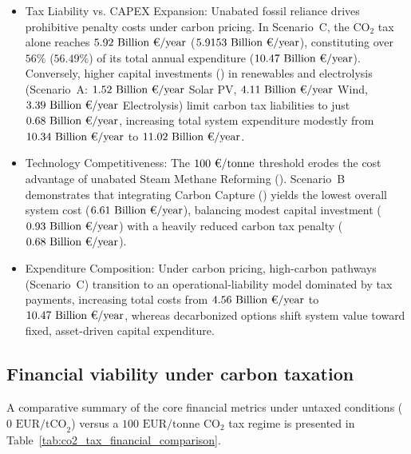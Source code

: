 \documentclass[preprint,12pt]{elsarticle}
\begin{document}
\begin{itemize}
    \item {Tax Liability vs. CAPEX Expansion:} Unabated fossil reliance drives prohibitive penalty costs under carbon pricing. In Scenario~C, the $\text{CO}_2$ tax alone reaches $5.92\text{~Billion~\texteuro/year}$ ($5.9153\text{~Billion~\texteuro/year}$), constituting over $56\%$ ($56.49\%$) of its total annual expenditure ($10.47\text{~Billion \texteuro/year}$). Conversely, higher capital investments () in renewables and electrolysis (Scenario~A: $1.52\text{~Billion \texteuro/year}$ Solar PV, $4.11\text{~Billion~\texteuro/year}$ Wind, $3.39\text{~Billion \texteuro/year}$ Electrolysis) limit carbon tax liabilities to just $0.68\text{~Billion \texteuro/year}$, increasing total system expenditure modestly from $10.34\text{~Billion \texteuro/year}$ to $11.02\text{~Billion \texteuro/year}$.
    \item {Technology Competitiveness:} The $100\text{~\texteuro/tonne}$ threshold erodes the cost advantage of unabated Steam Methane Reforming (). Scenario~B demonstrates that integrating Carbon Capture () yields the lowest overall system cost ($6.61\text{~Billion \texteuro/year}$), balancing modest capital investment ($0.93\text{~Billion \texteuro/year}$) with a heavily reduced carbon tax penalty ($0.68\text{~Billion \texteuro/year}$).
    \item {Expenditure Composition:} Under carbon pricing, high-carbon pathways (Scenario~C) transition to an operational-liability model dominated by tax payments, increasing total costs from $4.56\text{~Billion \texteuro/year}$ to $10.47\text{~Billion \texteuro/year}$, whereas decarbonized options shift system value toward fixed, asset-driven capital expenditure.
\end{itemize}

\subsection{Financial viability under carbon taxation}
A comparative summary of the core financial metrics under untaxed conditions ($0\text{~EUR/tCO}_2$) versus a $100\text{~EUR/tonne}$ $\text{CO}_2$ tax regime is presented in Table~\ref{tab:co2_tax_financial_comparison}.
\end{document}
